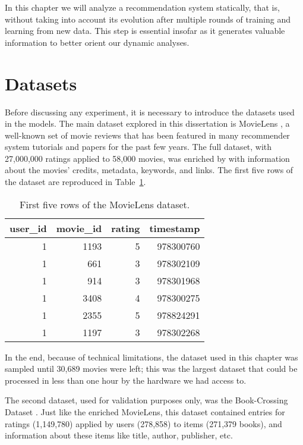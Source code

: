 In this chapter we will analyze a recommendation system statically, that is,
without taking into account its evolution after multiple rounds of training and
learning from new data. This step is essential insofar as it generates valuable
information to better orient our dynamic analyses.

\section{Datasets}
\label{sec:datasets03}

Before discussing any experiment, it is necessary to introduce the datasets used
in the models. The main dataset explored in this dissertation is MovieLens
\citep{harper_movielens_2015}, a well-known set of movie reviews that has been
featured in many recommender system tutorials and papers for the past few years.
The full dataset, with 27,000,000 ratings applied to 58,000 movies, was enriched
by \citet{banik_movies_2017} with information about the movies' credits,
metadata, keywords, and links. The first five rows of the dataset are reproduced
in Table~\ref{tab:tab03_head}.

\begin{table}[h]
  \begin{tabular}{ |r|r|r|r| }
    \hline
    user\_id & movie\_id & rating & timestamp\\
    \hline
    1 & 1193 & 5 & 978300760\\
    \hline
    1 & 661 & 3 & 978302109\\
    \hline
    1 & 914 & 3 & 978301968\\
    \hline
    1 & 3408 & 4 & 978300275\\
    \hline
    1 & 2355 & 5 & 978824291\\
    \hline
    1 & 1197 & 3 & 978302268\\
    \hline
  \end{tabular}

  \caption{First five rows of the MovieLens dataset.}
  \label{tab:tab03_head}
\end{table}

In the end, because of technical limitations, the dataset used in this chapter
was sampled until 30,689 movies were left; this was the largest dataset that
could be processed in less than one hour by the hardware we had access to.

The second dataset, used for validation purposes only, was the Book-Crossing
Dataset \citep{ziegler_book-crossing_2004}. Just like the enriched MovieLens,
this dataset contained entries for ratings (1,149,780) applied by users
(278,858) to items (271,379 books), and information about these items like
title, author, publisher, etc.

